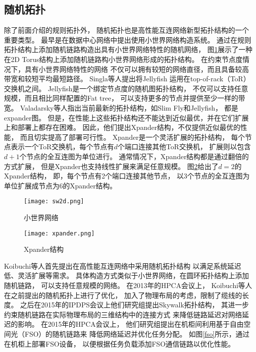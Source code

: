 \subsection{随机拓扑}

除了前面介绍的规则拓扑外，
随机拓扑也是高性能互连网络新型拓扑结构的一个重要类型。
最早是在数据中心网络中提出使用小世界网络构造系统。
通过在规则拓扑结构上添加随机链路构造出具有小世界网络特性的随机网络，
图\ref{sw2d}展示了一种在2D Torus结构上添加随机链路构小世界网络形成的拓扑结构。
在约束节点度情况下，具有小世界网络特性的网络
不仅可以拥有较短的网络直径，而且具备较高带宽和较短平均最短路径。
Singla等人提出将Jellyfish
运用在top-of-rack（ToR）交换机之间。
Jellyfish是一个绑定节点度的随机图拓扑结构，
不仅可以支持任意规模，而且相比同样配置的Fat tree，
可以支持更多的节点并提供至少一样的带宽。
Valadarsky等人指出当前最新的拓扑结构，如Slim Fly和Jellyfish，
都是expander图。
但是，在性能上这些拓扑结构还不能达到近似最优，并在它们扩展上和部署上都存在困难。
因此，他们提出Xpander结构，不仅提供近似最优的性能，
而且切实提高了部署可行性。
Xpander是一个灵活扩展的拓扑结构，
每个节点表示一个ToR交换机，每个节点有$d$个端口连接其他ToR交换机，
扩展则以包含$d+1$个节点的全互连图为单位进行。
通常情况下，Xpander结构都是通过翻倍的方式扩展，
但是Xpander也支持线性扩展来满足任意规模。
图\ref{xpander}给出了$d=2$的Xpander结构，
即，每个节点有2个端口连接其他节点，
以3个节点的全互连图为单位扩展成节点为6的Xpander结构。

\begin{figure}[htp]
\centering
\texttt{[image: sw2d.png]}
\caption{小世界网络}
\label{sw2d}
\end{figure}

\begin{figure}[htp]
\centering
\texttt{[image: xpander.png]}
\caption{Xpander结构}
\label{xpander}
\end{figure}

Koibuchi等人首先提出在高性能互连网络中采用随机拓扑结构
以满足系统延迟低、灵活扩展等需求。
具体构造方式类似于小世界网络，在圆环拓扑结构上添加随机链路，
可以支持任意规模的网络。
在2013年的HPCA会议上，
Koibuchi等人在之前提出的随机拓扑上进行了优化，
加入了物理布局的考虑，限制了缆线的长度。
之后在2015年的IPDPS会议上他们研究组提出Skywalk拓扑结构，
其进一步约束随机链路在实际物理布局的三维结构中的连接方式
来降低链路延迟对网络延迟的影响。
在2015年的HPCA会议上，
他们研究组提出在机柜间利用基于自由空间光（FSO）的随机链路来
降低网络延迟并优化任务分配。
如图\ref{fso}所示，通过在机柜上部署FSO设备，
以便根据任务负载添加FSO通信链路以优化性能。

